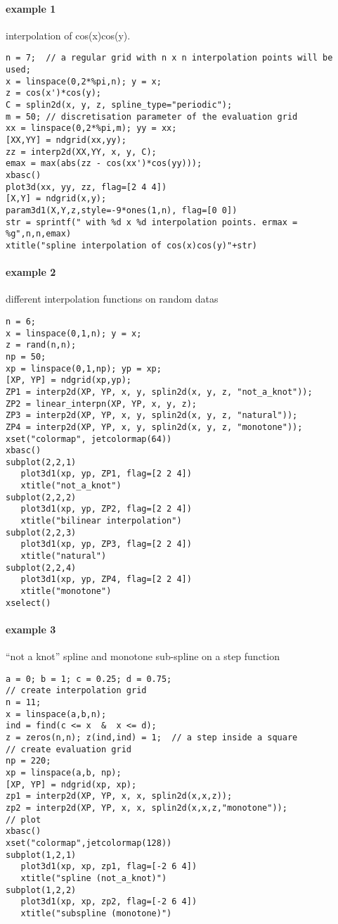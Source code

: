 \begin{examples}
\paragraph{example 1} interpolation of cos(x)cos(y). 
\begin{Verbatim}
n = 7;  // a regular grid with n x n interpolation points will be used;
x = linspace(0,2*%pi,n); y = x;
z = cos(x')*cos(y);
C = splin2d(x, y, z, spline_type="periodic");
m = 50; // discretisation parameter of the evaluation grid
xx = linspace(0,2*%pi,m); yy = xx;
[XX,YY] = ndgrid(xx,yy);
zz = interp2d(XX,YY, x, y, C);
emax = max(abs(zz - cos(xx')*cos(yy)));
xbasc()
plot3d(xx, yy, zz, flag=[2 4 4])
[X,Y] = ndgrid(x,y);
param3d1(X,Y,z,style=-9*ones(1,n), flag=[0 0])
str = sprintf(" with %d x %d interpolation points. ermax = %g",n,n,emax) 
xtitle("spline interpolation of cos(x)cos(y)"+str)
\end{Verbatim}

\paragraph{example 2} different interpolation functions on random datas
\begin{Verbatim}
n = 6;
x = linspace(0,1,n); y = x;
z = rand(n,n);
np = 50;
xp = linspace(0,1,np); yp = xp;
[XP, YP] = ndgrid(xp,yp);
ZP1 = interp2d(XP, YP, x, y, splin2d(x, y, z, "not_a_knot"));
ZP2 = linear_interpn(XP, YP, x, y, z);
ZP3 = interp2d(XP, YP, x, y, splin2d(x, y, z, "natural"));
ZP4 = interp2d(XP, YP, x, y, splin2d(x, y, z, "monotone"));
xset("colormap", jetcolormap(64))
xbasc()
subplot(2,2,1)
   plot3d1(xp, yp, ZP1, flag=[2 2 4])
   xtitle("not_a_knot")
subplot(2,2,2)
   plot3d1(xp, yp, ZP2, flag=[2 2 4])
   xtitle("bilinear interpolation")
subplot(2,2,3)
   plot3d1(xp, yp, ZP3, flag=[2 2 4])
   xtitle("natural")
subplot(2,2,4)
   plot3d1(xp, yp, ZP4, flag=[2 2 4])
   xtitle("monotone")
xselect()
\end{Verbatim}

\paragraph{example 3} ``not a knot'' spline and monotone sub-spline on a step function
\begin{Verbatim}
a = 0; b = 1; c = 0.25; d = 0.75;
// create interpolation grid
n = 11;
x = linspace(a,b,n);
ind = find(c <= x  &  x <= d); 
z = zeros(n,n); z(ind,ind) = 1;  // a step inside a square
// create evaluation grid
np = 220;
xp = linspace(a,b, np);
[XP, YP] = ndgrid(xp, xp);
zp1 = interp2d(XP, YP, x, x, splin2d(x,x,z));
zp2 = interp2d(XP, YP, x, x, splin2d(x,x,z,"monotone"));
// plot
xbasc()
xset("colormap",jetcolormap(128))
subplot(1,2,1)
   plot3d1(xp, xp, zp1, flag=[-2 6 4])
   xtitle("spline (not_a_knot)")
subplot(1,2,2)
   plot3d1(xp, xp, zp2, flag=[-2 6 4])
   xtitle("subspline (monotone)")
\end{Verbatim}

\end{examples}

